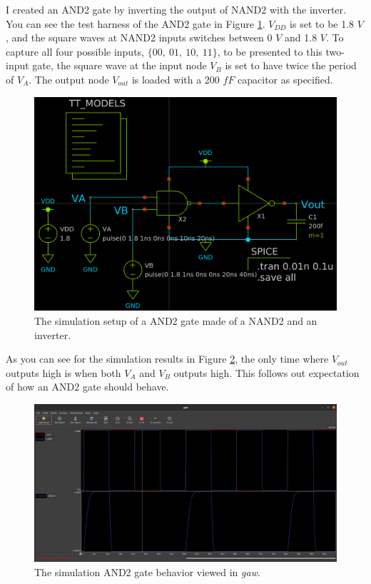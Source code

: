 \documentclass[11pt]{article}
\begin{document}
    \FloatBarrier
    I created an AND2 gate by inverting the output of NAND2 with the inverter. You can see the test harness of the AND2 gate in Figure \ref{fig:and2}. $V_{DD}$ is set to be 1.8 $V$, and the square waves at NAND2 inputs switches between 0 $V$ and 1.8 $V$. To capture all four possible inputs, $\{00,\ 01,\ 10,\ 11\}$, to be presented to this two-input gate, the square wave at the input node $V_B$ is set to have twice the period of $V_A$. The output node $V_{out}$ is loaded with a 200 $fF$ capacitor as specified.
    \begin{figure}[!ht]
        \includegraphics[width=\linewidth]{../img/AND2_harness.png}
        \caption{The simulation setup of a AND2 gate made of a NAND2 and an inverter.}
        \label{fig:and2}
    \end{figure}

    As you can see for the simulation results in Figure \ref{fig:and2res}, the only time where $V_{out}$ outputs high is when both $V_A$ and $V_B$ outputs high. This follows out expectation of how an AND2 gate should behave.
	\begin{figure}[!ht]
        \includegraphics[width=\linewidth]{../img/AND2_sim.png}
        \caption{The simulation AND2 gate behavior viewed in \textit{gaw}.}
        \label{fig:and2res}
    \end{figure}
\end{document}

